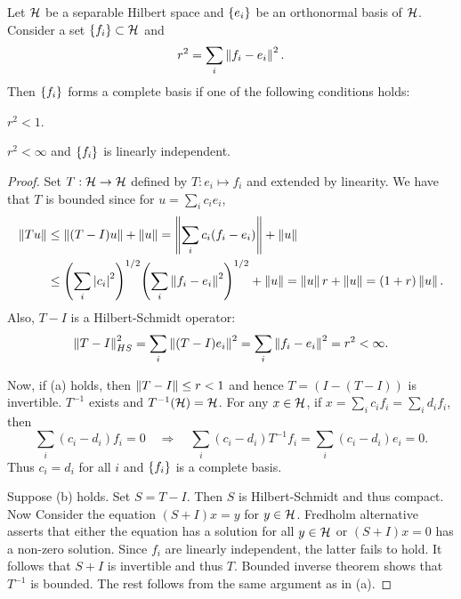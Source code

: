 \begin{theorem}
    Let $\mathcal{H}$ be a separable Hilbert space and $\left\{ {e_i} \right\}$ be an orthonormal 
    basis of $\mathcal{H}$. Consider a set $\left\{ {f_i} \right\}\subset\mathcal{H}$ and 
    \begin{equation*}
        r^2 = \sum_i \left\lVert {f_i - e_i} \right\rVert^2.
    \end{equation*}
    Then $\left\{ {f_i} \right\}$ forms a complete basis if one of the following 
    conditions holds: 
    \begin{thmenum}
        \item $r^2 < 1$. 
        \item $r^2 < \infty$ and $\left\{ {f_i} \right\}$ is linearly independent.
    \end{thmenum}
\end{theorem}
\begin{proof}
    Set $T:\mathcal{H}\to\mathcal{H}$ defined by $T:e_i\mapsto f_i$ and extended by linearity. 
    We have that $T$ is bounded since for $u = \sum_i c_ie_i$,
    \begin{equation*}
        \begin{split}
            \norm{Tu} &\leq \norm{(T-I)u} + \norm{u}
            = \norm{\sum_i c_i(f_i - e_i)} + \norm{u} \\
            &\leq \pth{\sum_i \abs{c_i}^2}^{1/2}\pth{\sum_i \norm{f_i - e_i}^2}^{1/2} + \norm{u} 
            = \norm{u}r + \norm{u} = (1+r)\norm{u}.
        \end{split}
    \end{equation*}
    Also, $T-I$ is a Hilbert-Schmidt operator: 
    \begin{equation*}
        \left\lVert {T-I} \right\rVert_{HS}^2 = \sum_i \left\lVert {(T-I)e_i} \right\rVert^2 = \sum_i \left\lVert {f_i - e_i} \right\rVert^2 = r^2 < \infty.
    \end{equation*}

    Now, if (a) holds, then $\left\lVert {T-I} \right\rVert \leq r < 1$ and hence $T = (I-(T-I))$ is invertible. 
    $T^{-1}$ exists and $T^{-1}(\mathcal{H}) = \mathcal{H}$. For any $x\in\mathcal{H}$, if $x = \sum_i c_if_i = \sum_i d_if_i$, 
    then 
    \begin{equation*}
        \sum_i (c_i - d_i)f_i = 0 \quad\Rightarrow\quad 
        \sum_i (c_i - d_i)T^{-1}f_i = \sum_i (c_i - d_i)e_i = 0.
    \end{equation*}
    Thus $c_i = d_i$ for all $i$ and $\left\{ {f_i} \right\}$ is a complete basis. 

    Suppose (b) holds. Set $S = T-I$. Then $S$ is Hilbert-Schmidt and thus 
    compact. Now Consider the equation $(S+I)x = y$ for $y\in\mathcal{H}$. Fredholm 
    alternative asserts that either the equation has a solution for all $y\in\mathcal{H}$ or 
    $(S+I)x = 0$ has a non-zero solution. Since $f_i$ are linearly independent, 
    the latter fails to hold. It follows that $S+I$ is invertible and thus $T$. 
    Bounded inverse theorem shows that $T^{-1}$ is bounded. The rest follows from the 
    same argument as in (a).
\end{proof}

